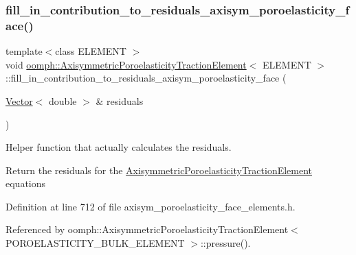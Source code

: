 \mbox{\label{classoomph_1_1AxisymmetricPoroelasticityTractionElement_a98e47ba16813ca8024932544a4b00e87}} 
\subsubsection{\texorpdfstring{fill\+\_\+in\+\_\+contribution\+\_\+to\+\_\+residuals\+\_\+axisym\+\_\+poroelasticity\+\_\+face()}{fill\_in\_contribution\_to\_residuals\_axisym\_poroelasticity\_face()}}
{\footnotesize\ttfamily template$<$class E\+L\+E\+M\+E\+NT $>$ \\
void \hyperlink{classoomph_1_1AxisymmetricPoroelasticityTractionElement}{oomph\+::\+Axisymmetric\+Poroelasticity\+Traction\+Element}$<$ E\+L\+E\+M\+E\+NT $>$\+::fill\+\_\+in\+\_\+contribution\+\_\+to\+\_\+residuals\+\_\+axisym\+\_\+poroelasticity\+\_\+face (\begin{DoxyParamCaption}\item[{\hyperlink{classoomph_1_1Vector}{Vector}$<$ double $>$ \&}]{residuals }\end{DoxyParamCaption})\hspace{0.3cm}{\ttfamily [protected]}}



Helper function that actually calculates the residuals. 

Return the residuals for the \hyperlink{classoomph_1_1AxisymmetricPoroelasticityTractionElement}{Axisymmetric\+Poroelasticity\+Traction\+Element} equations 

Definition at line 712 of file axisym\+\_\+poroelasticity\+\_\+face\+\_\+elements.\+h.



Referenced by oomph\+::\+Axisymmetric\+Poroelasticity\+Traction\+Element$<$ P\+O\+R\+O\+E\+L\+A\+S\+T\+I\+C\+I\+T\+Y\+\_\+\+B\+U\+L\+K\+\_\+\+E\+L\+E\+M\+E\+N\+T $>$\+::pressure().


